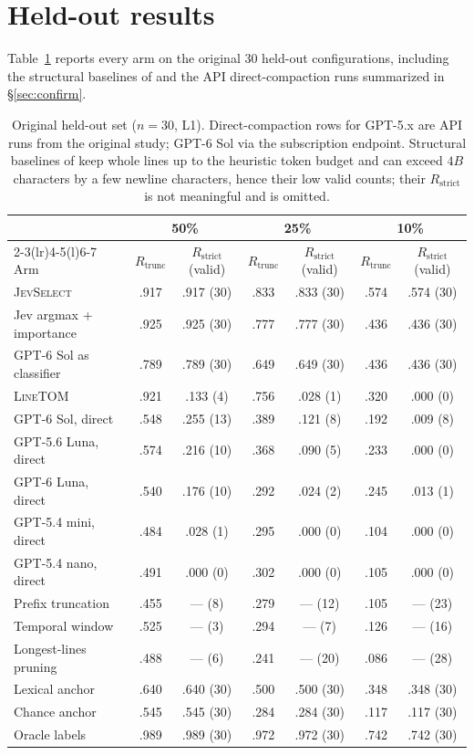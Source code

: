 \documentclass[11pt,a4paper]{article}
\newcommand{\sel}{\textsc{JevSelect}}
\newcommand{\linetom}{\textsc{LineTOM}}
\newcommand{\Rt}{R_{\mathrm{trunc}}}
\newcommand{\Rs}{R_{\mathrm{strict}}}
\begin{document}
\section{Held-out results}\label{app:held}
Table~\ref{tab:held} reports every arm on the original 30 held-out configurations, including the structural baselines of \citet{zerhoudi2026cliff} and the API direct-compaction runs summarized in \S\ref{sec:confirm}.
\begin{table}[H]\centering\small
\caption{Original held-out set ($n=30$, L1). Direct-compaction rows for GPT-5.x are API runs from the original study; GPT-6 Sol via the subscription endpoint. Structural baselines of \citet{zerhoudi2026cliff} keep whole lines up to the heuristic token budget and can exceed $4B$ characters by a few newline characters, hence their low valid counts; their $\Rs$ is not meaningful and is omitted.}\label{tab:held}
\setlength{\tabcolsep}{3.5pt}
\begin{tabular}{@{}lcccccc@{}}\toprule
& \multicolumn{2}{c}{50\%} & \multicolumn{2}{c}{25\%} & \multicolumn{2}{c}{10\%}\\\cmidrule(lr){2-3}\cmidrule(lr){4-5}\cmidrule(l){6-7}
Arm & $\Rt$ & $\Rs$ (valid) & $\Rt$ & $\Rs$ (valid) & $\Rt$ & $\Rs$ (valid)\\\midrule
\sel{} & .917 & .917 (30) & .833 & .833 (30) & .574 & .574 (30)\\
Jev argmax + importance & .925 & .925 (30) & .777 & .777 (30) & .436 & .436 (30)\\
GPT-6 Sol as classifier & .789 & .789 (30) & .649 & .649 (30) & .436 & .436 (30)\\
\linetom{} & .921 & .133 (4) & .756 & .028 (1) & .320 & .000 (0)\\
GPT-6 Sol, direct & .548 & .255 (13) & .389 & .121 (8) & .192 & .009 (8)\\
GPT-5.6 Luna, direct & .574 & .216 (10) & .368 & .090 (5) & .233 & .000 (0)\\
GPT-6 Luna, direct & .540 & .176 (10) & .292 & .024 (2) & .245 & .013 (1)\\
GPT-5.4 mini, direct & .484 & .028 (1) & .295 & .000 (0) & .104 & .000 (0)\\
GPT-5.4 nano, direct & .491 & .000 (0) & .302 & .000 (0) & .105 & .000 (0)\\
Prefix truncation & .455 & --- (8) & .279 & --- (12) & .105 & --- (23)\\
Temporal window & .525 & --- (3) & .294 & --- (7) & .126 & --- (16)\\
Longest-lines pruning & .488 & --- (6) & .241 & --- (20) & .086 & --- (28)\\\midrule
Lexical anchor & .640 & .640 (30) & .500 & .500 (30) & .348 & .348 (30)\\
Chance anchor & .545 & .545 (30) & .284 & .284 (30) & .117 & .117 (30)\\
Oracle labels & .989 & .989 (30) & .972 & .972 (30) & .742 & .742 (30)\\\bottomrule
\end{tabular}
\end{table}
\end{document}
